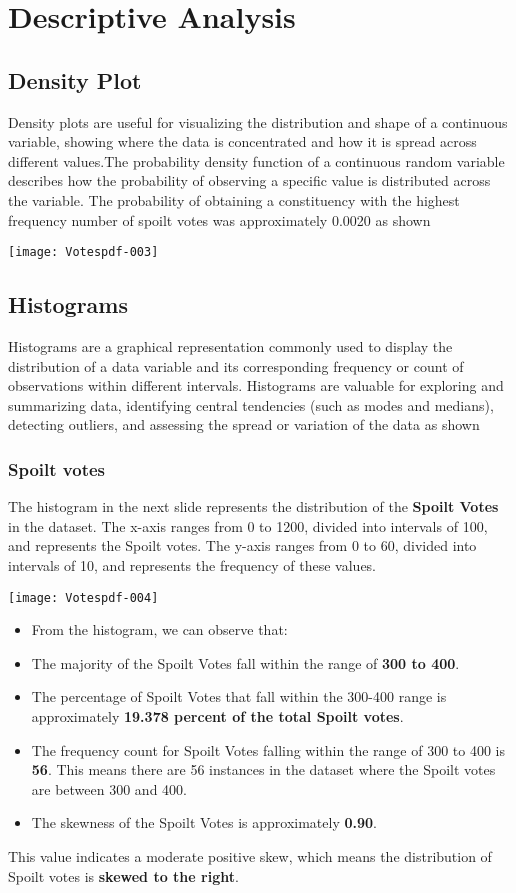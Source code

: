 \documentclass[fleqn,a4paper,12pt]{article}
\begin{document}
\section{Descriptive Analysis}
\subsection{Density Plot}

Density plots are useful for visualizing the distribution and shape of a continuous variable, showing where the data is concentrated and how it is spread across different values.The probability density function of a continuous random variable describes how the probability of observing a specific value is distributed across the variable. The probability of obtaining a constituency with the highest frequency number of spoilt votes was approximately 0.0020 as shown


\texttt{[image: Votespdf-003]}

\subsection{Histograms}

Histograms are a graphical representation commonly used to display the distribution of a data variable and its corresponding frequency or count of observations within different intervals. Histograms are valuable for exploring and summarizing data, identifying central tendencies (such as modes and medians), detecting outliers, and assessing the spread or variation of the data as shown

\subsubsection{Spoilt votes}


The histogram in the next slide represents the distribution of the \textbf {Spoilt Votes} in the dataset. The x-axis ranges from 0 to 1200, divided into intervals of 100, and represents the Spoilt votes. The y-axis ranges from 0 to 60, divided into intervals of 10, and represents the frequency of these values.


\texttt{[image: Votespdf-004]}

\begin{itemize}
\item From the histogram, we can observe that:
\item The majority of the Spoilt Votes fall within the range of \textbf{300 to 400}.
\item The percentage of Spoilt Votes that fall within the 300-400 range is approximately \textbf{19.378 percent of the total Spoilt votes}.
\item The frequency count for Spoilt Votes falling within the range of 300 to 400 is \textbf{56}. This means there are 56 instances in the dataset where the Spoilt votes are between 300 and 400.
\item The skewness of the Spoilt Votes is approximately \textbf{0.90}.
\end{itemize}
This value indicates a moderate positive skew, which means the distribution of Spoilt votes is \textbf{skewed to the right}.
\end{document}
